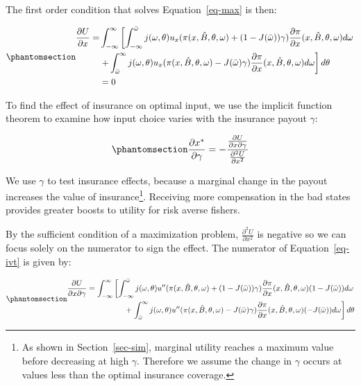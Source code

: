 \documentclass[
  letterpaper,
  DIV=11,
  numbers=noendperiod]{scrartcl}
\theoremstyle{plain}
\theoremstyle{plain}
\theoremstyle{remark}
\begin{document}
The first order condition that solves Equation~\ref{eq-max} is then:

\begin{equation}\phantomsection\label{eq-foc1}{
\begin{aligned}
\frac{\partial U}{\partial x}=&\int^{\infty}_{-\infty}\left[ \int^{\bar \omega}_{-\infty}j(\omega,\theta)u_{x}(\pi(x,\hat{B},\theta,\omega)+(1-J(\bar \omega))\gamma)\frac{\partial \pi}{\partial x}(x,\hat{B},\theta,\omega)d\omega\right.\\
&\left.+\int^{\infty}_{\bar{\omega}}j(\omega,\theta) u_{x}(\pi(x,\hat{B},\theta,\omega)-J(\bar \omega)\gamma)\frac{\partial \pi}{\partial x}(x,\hat{B},\theta,\omega)d\omega\right] d\theta\\
&=0
\end{aligned}
}\end{equation}

To find the effect of insurance on optimal input, we use the implicit
function theorem to examine how input choice varies with the insurance
payout \(\gamma\):

\begin{equation}\phantomsection\label{eq-ivt}{
\frac{\partial x^{*}}{\partial \gamma}=-\frac{\frac{\partial U}{\partial x \partial \gamma}}{\frac{\partial^2 U}{\partial x^{2}}}
}\end{equation}

We use \(\gamma\) to test insurance effects, because a marginal change
in the payout increases the value of insurance\footnote{As shown in
  Section~\ref{sec-sim}, marginal utility reaches a maximum value before
  decreasing at high \(\gamma\). Therefore we assume the change in
  \(\gamma\) occurs at values less than the optimal insurance coverage.}.
Receiving more compensation in the bad states provides greater boosts to
utility for risk averse fishers.

By the sufficient condition of a maximization problem,
\(\frac{\partial^2 U}{\partial x^{2}}\) is negative so we can focus
solely on the numerator to sign the effect. The numerator of
Equation~\ref{eq-ivt} is given by:

\begin{equation}\phantomsection\label{eq-xgam}{
\begin{aligned}
\frac{\partial U}{\partial x \partial \gamma}=\int^{\infty}_{-\infty}\left[ \int^{\bar \omega}_{-\infty}j(\omega,\theta)u''(\pi(x,\hat{B},\theta,\omega)+(1-J(\bar \omega))\gamma)\frac{\partial \pi}{\partial x}(x,\hat{B},\theta,\omega)(1-J(\bar \omega))d\omega\right.\\
+\left.\int^{\infty}_{\bar{\omega}}j(\omega,\theta) u''(\pi(x,\hat{B},\theta,\omega)-J(\bar \omega)\gamma)\frac{\partial \pi}{\partial x}(x,\hat{B},\theta,\omega)(-J(\bar \omega))d\omega\right] d\theta
\end{aligned}
}\end{equation}
\end{document}
